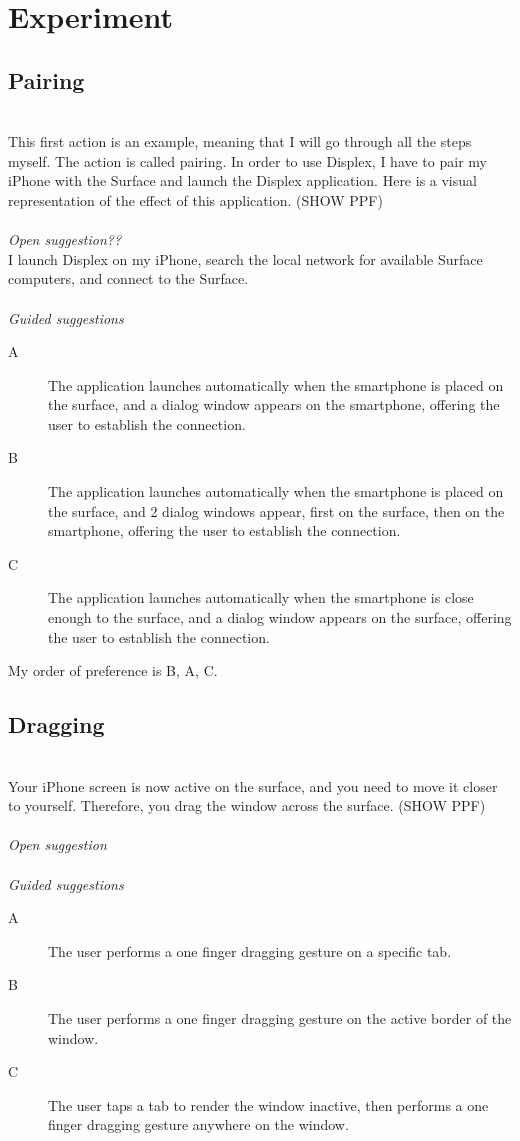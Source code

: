 \documentclass[11pt]{amsart}
\begin{document}
\pagebreak

\section{Experiment}

\subsection{Pairing}
\hfill\\
This first action is an example, meaning that I will go through all the steps myself.
The action is called pairing.
In order to use Displex, I have to pair my iPhone with the Surface and launch the Displex application. Here is a visual representation of the effect of this application.
(SHOW PPF)
\\\\
\emph{Open suggestion??}\\
I launch Displex on my iPhone, search the local network for available Surface computers, and connect to the Surface.
\\\\
\emph{Guided suggestions}
\begin{description}
\item[A]{The application launches automatically when the smartphone is placed on the surface, and a dialog window appears on the smartphone, offering the user to establish the connection.}
\item[B]{The application launches automatically when the smartphone is placed on the surface, and 2 dialog windows appear, first on the surface, then on the smartphone, offering the user to establish the connection.}
\item[C]{The application launches automatically when the smartphone is close enough to the surface, and a dialog window appears on the surface, offering the user to establish the connection.}
\end{description}

My order of preference is B, A, C.

\subsection{Dragging}
\hfill\\
Your iPhone screen is now active on the surface, and you need to move it closer to yourself. Therefore, you drag the window across the surface.
(SHOW PPF)
\\\\
\emph{Open suggestion}
\\\\
\emph{Guided suggestions}
\begin{description}
\item[A]{The user performs a one finger dragging gesture on a specific tab.}
\item[B]{The user performs a one finger dragging gesture on the active border of the window.}
\item[C]{The user taps a tab to render the window inactive, then performs a one finger dragging gesture anywhere on the window.}
\end{description}
\end{document}
